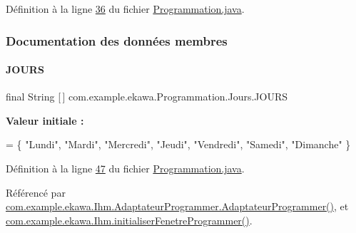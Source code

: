 Définition à la ligne \hyperlink{_programmation_8java_source_l00036}{36} du fichier \hyperlink{_programmation_8java_source}{Programmation.\+java}.



\subsubsection{Documentation des données membres}
\mbox{\label{classcom_1_1example_1_1ekawa_1_1_programmation_1_1_jours_a45d873d90f82a1cdeabeba21a37b7aba}} 
\paragraph{\texorpdfstring{J\+O\+U\+RS}{JOURS}}
{\footnotesize\ttfamily final String \mbox{[}$\,$\mbox{]} com.\+example.\+ekawa.\+Programmation.\+Jours.\+J\+O\+U\+RS\hspace{0.3cm}{\ttfamily [static]}}

{\bfseries Valeur initiale \+:}
\begin{DoxyCode}
=
        \{
            \textcolor{stringliteral}{"Lundi"},
            \textcolor{stringliteral}{"Mardi"},
            \textcolor{stringliteral}{"Mercredi"},
            \textcolor{stringliteral}{"Jeudi"},
            \textcolor{stringliteral}{"Vendredi"},
            \textcolor{stringliteral}{"Samedi"},
            \textcolor{stringliteral}{"Dimanche"}
        \}
\end{DoxyCode}


Définition à la ligne \hyperlink{_programmation_8java_source_l00047}{47} du fichier \hyperlink{_programmation_8java_source}{Programmation.\+java}.



Référencé par \hyperlink{_ihm_8java_source_l00190}{com.\+example.\+ekawa.\+Ihm.\+Adaptateur\+Programmer.\+Adaptateur\+Programmer()}, et \hyperlink{_ihm_8java_source_l00727}{com.\+example.\+ekawa.\+Ihm.\+initialiser\+Fenetre\+Programmer()}.

\mbox{\label{classcom_1_1example_1_1ekawa_1_1_programmation_1_1_jours_af73668910813425a74baccc5940153ef}} 
